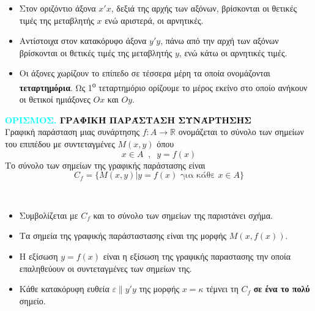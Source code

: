 \documentclass[twoside,10pt]{book}
\newenvironment{WrapText1}[3][r]
{\wrapfigure[#2]{#1}{#3}}
{\endwrapfigure}
\newcounter{orismos}[chapter]
\renewcommand{\theorismos}{\thechapter.\arabic{orismos}}
\newcommand{\Orismos}[1]{\refstepcounter{orismos}\textcolor{cyan}{\textbf{ΟΡΙΣΜΟΣ\hspace{2mm}\theorismos\hspace{1mm} \textcolor{black}{\MakeUppercase{#1}}}}\\}{}
\begin{document}
\vspace{-2mm}
\begin{itemize}
\item Στον οριζόντιο άξονα $ x'x $, δεξιά της αρχής των αξόνων, βρίσκονται οι θετικές τιμές της μεταβλητής $x$ ενώ αριστερά, οι αρνητικές.
\item Αντίστοιχα στον κατακόρυφο άξονα $ y'y $, πάνω από την αρχή των αξόνων βρίσκονται οι θετικές τιμές της μεταβλητής $y$, ενώ κάτω οι αρνητικές τιμές.
\item Οι άξονες χωρίζουν το επίπεδο σε τέσσερα μέρη τα οποία ονομάζονται \textbf{τεταρτημόρια}. Ως 1\textsuperscript{ο} τεταρτημόριο ορίζουμε το μέρος εκείνο στο οποίο ανήκουν οι θετικοί ημιάξονες $ Ox $ και $ Oy $.
\end{itemize}
\Orismos{Γραφική Παράσταση συνάρτησησ}
Γραφική παράσταση μιας συνάρτησης $ f:A\rightarrow\mathbb{R} $ ονομάζεται το σύνολο των σημείων του επιπέδου με συντεταγμένες $ M(x,y) $ όπου \[ x\in A\;\;,\;\;y=f(x) \]
Το σύνολο των σημείων της γραφικής παράστασης είναι 
\[ C_f=\{M(x,y)|y=f(x)\textrm{ για κάθε }x\in A\} \]
\begin{minipage}{\linewidth}\mbox{}\\
\vspace{-1.2cm}
\begin{WrapText1}{8}{5cm}
\vspace{0mm}
\end{WrapText1}
\begin{itemize}[itemsep=0mm]
\item Συμβολίζεται με $ C_f $ και το σύνολο των σημείων της παριστάνει σχήμα.
\item Τα σημεία της γραφικής παράσταστασης είναι της μορφής $Μ\left(x,f(x)\right) $.
\item Η εξίσωση $ y=f(x) $ είναι η εξίσωση της γραφικής παραστασης την οποία επαληθεύουν οι συντεταγμένες των σημείων της.
\item Κάθε κατακόρυφη ευθεία $ \varepsilon\parallel y'y $ της μορφής $ x=\kappa $ τέμνει τη $ C_f $ \textbf{σε ένα το πολύ} σημείο.
\end{itemize}\end{minipage}
\end{document}
